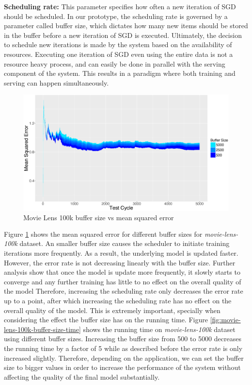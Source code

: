 \documentclass{vldb}
\begin{document}
\textbf{Scheduling rate:} This parameter specifies how often a new iteration of SGD should be scheduled. 
In our prototype, the scheduling rate is governed by a parameter called buffer size, which dictates how many new items should be stored in the buffer before a new iteration of SGD is executed. 
Ultimately, the decision to schedule new iterations is made by the system based on the availability of resources. 
Executing one iteration of SGD even using the entire data is not a resource heavy process, and can easily be done in parallel with the serving component of the system. 
This results in a paradigm where both training and serving can happen simultaneously. 

\begin{figure}[H]
\centering
\includegraphics[width=\columnwidth]{../images/experiment-results/movie-lens-100k-buffer-size-improved.eps}
\caption{Movie Lens 100k buffer size vs mean squared error}
\label{fig:movie-lens-100k-buffer-size-mse}
\end{figure}

Figure \ref{fig:movie-lens-100k-buffer-size-mse} shows the mean squared error for different buffer sizes for \textit{movie-lens-100k} dataset. 
An smaller buffer size causes the scheduler to initiate training iterations more frequently.
As a result, the underlying model is updated faster.
However, the error rate is not decreasing linearly with the buffer size.
Further analysis show that once the model is update more frequently, it slowly starts to converge and any further training has little to no effect on the overall quality of the model
Therefore, increasing the scheduling rate only decreases the error rate up to a point, after which increasing the scheduling rate has no effect on the overall quality of the model.
This is extremely important, specially when considering the effect the buffer size has on the running time.
Figure \ref{fig:movie-lens-100k-buffer-size-time} shows the running time on \textit{movie-lens-100k} dataset using different buffer sizes. 
Increasing the buffer size from 500 to 5000 decreases the running time by a factor of 5 while as described before the error rate is only increased slightly.
Therefore, depending on the application, we can set the buffer size to bigger values in order to increase the performance of the system without affecting the quality of the final model substantially.
\end{document}

